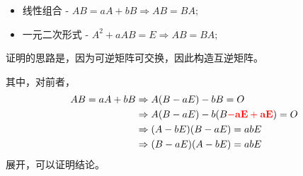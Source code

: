 
\begin{itemize}
    \item 线性组合 - $ AB = aA+bB \Rightarrow AB = BA; $ 
    \item 一元二次形式 - $ A^2 + aAB = E \Rightarrow AB = BA; $
\end{itemize}

证明的思路是，因为可逆矩阵可交换，因此构造互逆矩阵。

其中，对前者，
\begin{equation*}
    \begin{aligned}
        AB = aA + bB &\Rightarrow A(B-aE) - bB = O \\ 
        &\Rightarrow A(B-aE) - b(B\textcolor{red}{\bf{-aE+aE}}) = O \\ 
        &\Rightarrow (A-bE)(B-aE) = abE \\
        &\Rightarrow (B-aE)(A-bE) = abE
    \end{aligned}
\end{equation*}
展开，可以证明结论。